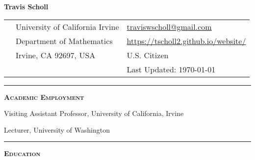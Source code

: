 \documentclass[12pt]{article}
\newcommand{\sectionheading}[1]
{
\bigskip %
\noindent
\hspace{-6.5mm}\textcolor{Gray}{\rule[.75mm]{21.5mm}{1mm}} %
\hspace{.2mm}	%
{\large{\textbf{\textsc{#1}}}} %
}
\newenvironment{date_section}
	{
	\vspace{-1ex}
	\leftmargini = 15ex
		\begin{itemize}[
			labelsep = *,
			labelwidth = 9ex,
			labelindent = 0ex,
			itemindent = !,
			font=\normalfont,
			align=parleft
		]{}
		\itemsep=-1.5mm
	}
	{\end{itemize}\vspace{-2ex}}
\newcommand{\yearrange}[2]{
	\item[
		{\makebox[1ex][r]{#1}}
		--
		{\makebox[1ex][l]{#2} }
		] }
\begin{document}

	\thispagestyle{empty}

	\centerline{{\LARGE \textbf{Travis Scholl}}}

	\vspace{3mm}

	\begin{center}
		\begin{tabular}[c]{lll} %
			\phantom{aaaaaaaaa} %
			& University of California Irvine
				& \url{traviswscholl@gmail.com} \\
 			& Department of Mathematics
				& \url{https://tscholl2.github.io/website/}\\
 			& Irvine, CA 92697, USA
	 			& U.S. Citizen \\
			&
				& Last Updated: \today
		\end{tabular}
	\end{center}








	\sectionheading{Academic Employment}%

	\begin{date_section}
		\yearrange{2018}{(cur.)} Visiting Assistant Professor, University of California, Irvine %

		\yearrange{2018}{2018} Lecturer, University of Washington %

	\end{date_section}







	\sectionheading{Education}%
\end{document}
